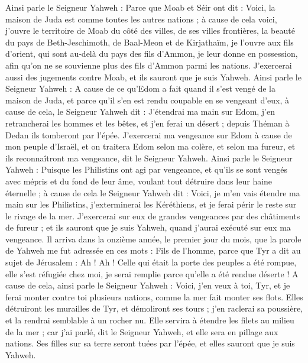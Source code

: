 \begin{multicols}{2}
Ainsi parle le Seigneur Yahweh : Parce que Moab et Séir ont dit : Voici, la maison de Juda est comme toutes les autres nations ;
à cause de cela voici, j’ouvre le territoire de Moab du côté des villes, de ses villes frontières, la beauté du pays de Beth-Jeschimoth, de Baal-Meon et de Kirjathaïm\FTNT{},
je l’ouvre aux fils d'orient, qui sont au-delà du pays des fils d’Ammon, je leur donne en possession, afin qu'on ne se souvienne plus des fils d’Ammon parmi les nations.
J'exercerai aussi des jugements contre Moab, et ils sauront que je suis Yahweh.
Ainsi parle le Seigneur Yahweh : A cause de ce qu'Edom a fait quand il s'est vengé de la maison de Juda, et parce qu'il s’en est rendu coupable en se vengeant d'eux\FTNT{},
à cause de cela, le Seigneur Yahweh dit : J'étendrai ma main sur Edom, j'en retrancherai les hommes et les bêtes, et j’en ferai un désert ; depuis Théman à Dedan ils tomberont par l'épée\FTNT{}.
J'exercerai ma vengeance sur Edom à cause de mon peuple d'Israël, et on traitera Edom selon ma colère, et selon ma fureur, et ils reconnaîtront ma vengeance, dit le Seigneur Yahweh.
Ainsi parle le Seigneur Yahweh : Puisque les Philistins ont agi par vengeance, et qu'ils se sont vengés avec mépris et du fond de leur âme, voulant tout détruire dans leur haine éternelle ;
à cause de cela le Seigneur Yahweh dit : Voici, je m'en vais étendre ma main sur les Philistins, j'exterminerai les Kéréthiens, et je ferai périr le reste sur le rivage de la mer.
J’exercerai sur eux de grandes vengeances par des châtiments de fureur ; et ils sauront que je suis Yahweh, quand j'aurai exécuté sur eux ma vengeance\FTNT{}.
\VerseOne{}Il arriva dans la onzième année, le premier jour du mois, que la parole de Yahweh me fut adressée en ces mots :
Fils de l’homme, parce que Tyr a dit au sujet de Jérusalem : Ah ! Ah ! Celle qui était la porte des peuples a été rompue, elle s'est réfugiée chez moi, je serai remplie parce qu'elle a été rendue déserte\FTNT{} !
A cause de cela, ainsi parle le Seigneur Yahweh : Voici, j'en veux à toi, Tyr, et je ferai monter contre toi plusieurs nations, comme la mer fait monter ses flots\FTNT{}.
Elles détruiront les murailles de Tyr, et démoliront ses tours ; j’en raclerai sa poussière, et la rendrai semblable à un rocher nu\FTNT{}.
Elle servira à étendre les filets au milieu de la mer ; car j'ai parlé, dit le Seigneur Yahweh, et elle sera en pillage aux nations.
Ses filles sur sa terre seront tuées par l'épée, et elles sauront que je suis Yahweh.

\end{multicols}
